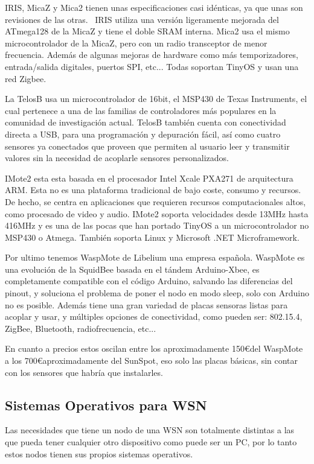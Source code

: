 IRIS, MicaZ y Mica2 tienen unas especificaciones casi idénticas, ya que unas son revisiones de las otras. \ IRIS utiliza una versión ligeramente mejorada del ATmega128 de la MicaZ y tiene el doble SRAM interna. Mica2 usa el mismo microcontrolador de la MicaZ, pero con un radio transceptor de menor frecuencia. Además de algunas mejoras de hardware como más temporizadores, entrada/salida digitales, puertos SPI, etc... Todas soportan TinyOS y usan una red Zigbee.



La TelosB usa un microcontrolador de 16bit, el MSP430 de Texas Instruments, el cual pertenece a una de las familias de controladores más populares en la comunidad de investigación actual. TelosB también cuenta con conectividad directa a USB, para una programación y depuración fácil, así como cuatro sensores ya conectados que proveen que permiten al usuario leer y transmitir valores sin la necesidad de acoplarle sensores personalizados.



IMote2 esta esta basada en el procesador Intel Xcale PXA271 de arquitectura ARM. Esta no es una plataforma tradicional de bajo coste, consumo y recursos. De hecho, se centra en aplicaciones que requieren recursos computacionales altos, como procesado de video y audio. IMote2 soporta velocidades desde 13MHz hasta 416MHz y es una de las pocas que han portado TinyOS a un microcontrolador no MSP430 o Atmega. También soporta Linux y Microsoft .NET Microframework.




Por ultimo tenemos WaspMote de Libelium una empresa española. WaspMote es una evolución de la SquidBee basada en el tándem Arduino-Xbee, es completamente compatible con el código Arduino, salvando las diferencias del pinout, y soluciona el problema de poner el nodo en modo sleep, solo con Arduino no es posible. Además tiene una gran variedad de placas sensoras listas para acoplar y usar, y múltiples opciones de conectividad, como pueden ser: 802.15.4, ZigBee, Bluetooth, radiofrecuencia, etc...



En cuanto a precios estos oscilan entre los aproximadamente 150\euro del WaspMote a los 700\euro aproximadamente del SunSpot, eso solo las placas básicas, sin contar con los sensores que habría que instalarles.



\subsection{Sistemas Operativos para WSN}
Las necesidades que tiene un nodo de una WSN son totalmente distintas a las que pueda tener cualquier otro dispositivo como puede ser un PC, por lo tanto estos nodos tienen sus propios sistemas operativos.




